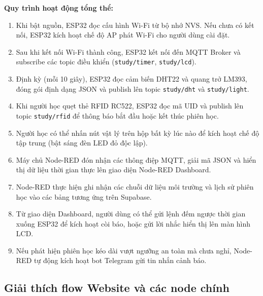 \vspace{0.2cm}
\textbf{Quy trình hoạt động tổng thể:}
\begin{enumerate}
    \item Khi bật nguồn, ESP32 đọc cấu hình Wi-Fi từ bộ nhớ NVS. Nếu chưa có kết nối, ESP32 kích hoạt chế độ AP phát Wi-Fi cho người dùng cài đặt.
    \item Sau khi kết nối Wi-Fi thành công, ESP32 kết nối đến MQTT Broker và subscribe các topic điều khiển (\texttt{study/timer}, \texttt{study/lcd}).
    \item Định kỳ (mỗi 10 giây), ESP32 đọc cảm biến DHT22 và quang trở LM393, đóng gói định dạng JSON và publish lên topic \texttt{study/dht} và \texttt{study/light}.
    \item Khi người học quẹt thẻ RFID RC522, ESP32 đọc mã UID và publish lên topic \texttt{study/rfid} để thông báo bắt đầu hoặc kết thúc phiên học.
    \item Người học có thể nhấn nút vật lý trên hộp bất kỳ lúc nào để kích hoạt chế độ tập trung (bật sáng đèn LED đỏ độc lập).
    \item Máy chủ Node-RED đón nhận các thông điệp MQTT, giải mã JSON và hiển thị dữ liệu thời gian thực lên giao diện Node-RED Dashboard.
    \item Node-RED thực hiện ghi nhận các chuỗi dữ liệu môi trường và lịch sử phiên học vào các bảng tương ứng trên Supabase.
    \item Từ giao diện Dashboard, người dùng có thể gửi lệnh đếm ngược thời gian xuống ESP32 để kích hoạt còi báo, hoặc gửi lời nhắc hiển thị lên màn hình LCD.
    \item Nếu phát hiện phiên học kéo dài vượt ngưỡng an toàn mà chưa nghỉ, Node-RED tự động kích hoạt bot Telegram gửi tin nhắn cảnh báo.
\end{enumerate}

\subsection{Giải thích flow Website và các node chính}


